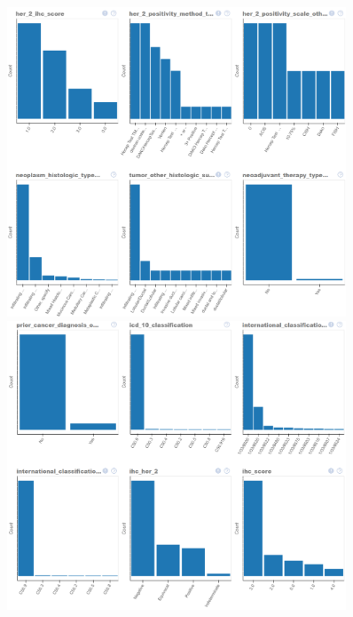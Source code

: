 \begin{figure}
	\includegraphics[width=0.9\textwidth]{NOTEBOOK/IMAGES_EDA/7}
	\includegraphics[width=0.9\textwidth]{NOTEBOOK/IMAGES_EDA/8}
\end{figure}

